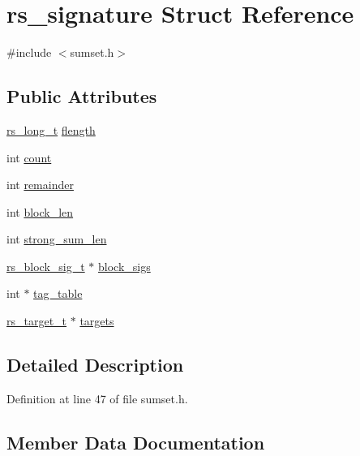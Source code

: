 \hypertarget{structrs__signature}{}\section{rs\+\_\+signature Struct Reference}
\label{structrs__signature}


{\ttfamily \#include $<$sumset.\+h$>$}

\subsection*{Public Attributes}
\begin{DoxyCompactItemize}
\item 
\hyperlink{librsync-config_8h_a6edddd44ca74c10ea65ef82d116e0ffa}{rs\+\_\+long\+\_\+t} \hyperlink{structrs__signature_a693046a30f8faf1227ec940ea763572e}{flength}
\item 
int \hyperlink{structrs__signature_a0d2dd24f39336f0e00036da675d63f99}{count}
\item 
int \hyperlink{structrs__signature_a8bd8dfaab78ca01823b9fb0cdd8c8b6c}{remainder}
\item 
int \hyperlink{structrs__signature_a8df88cba2f5ef197c2dabc72579409e6}{block\+\_\+len}
\item 
int \hyperlink{structrs__signature_add195cbc6542234b4b59971b1ddf4e1b}{strong\+\_\+sum\+\_\+len}
\item 
\hyperlink{sumset_8h_afae2c65649949b883263dd30ac161853}{rs\+\_\+block\+\_\+sig\+\_\+t} $\ast$ \hyperlink{structrs__signature_a0741239f0459768e595c5fe433ef01af}{block\+\_\+sigs}
\item 
int $\ast$ \hyperlink{structrs__signature_a1e39937d73023e4c238f6c6e42acc9ac}{tag\+\_\+table}
\item 
\hyperlink{sumset_8h_a480196c91c74c74a9d00beecbee907f1}{rs\+\_\+target\+\_\+t} $\ast$ \hyperlink{structrs__signature_aee551f0003c68e2ad1dadb83e4874a15}{targets}
\end{DoxyCompactItemize}


\subsection{Detailed Description}


Definition at line 47 of file sumset.\+h.



\subsection{Member Data Documentation}
\hypertarget{structrs__signature_a8df88cba2f5ef197c2dabc72579409e6}{}
